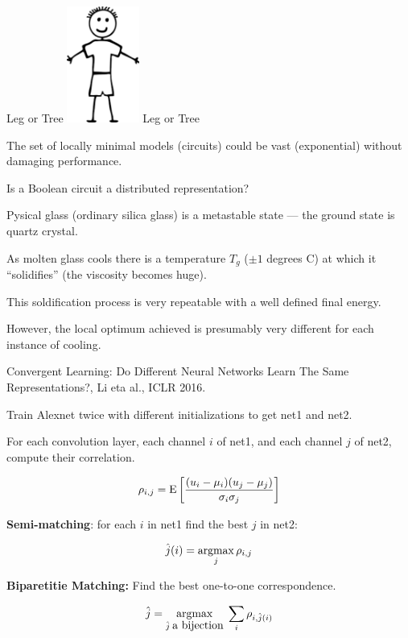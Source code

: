 {{\vfill
\centerline{Leg or Tree  \includegraphics[height=1.5in]{../images/StickFig} Leg or Tree}
}

\vfill
The set of locally minimal models (circuits) could be vast (exponential) without damaging performance.

\vfill
Is a Boolean circuit a distributed representation?


Pysical glass (ordinary silica glass) is a metastable state  --- the ground state is quartz crystal.

\vfill
As molten glass cools there is a temperature $T_g$ ($\pm 1$ degrees C) at which it ``solidifies'' (the viscosity becomes huge).

\vfill
This soldification process is very repeatable with a well defined final energy.

\vfill
However, the local optimum achieved is presumably very different for each instance of cooling.


Convergent Learning: Do Different Neural
Networks Learn The Same Representations?, Li eta al., ICLR 2016.

\vfill
Train Alexnet twice with different initializations to get net1 and net2.

\vfill
For each convolution layer, each channel $i$ of net1, and each channel $j$ of net2, compute their correlation.

\vfill
$$\rho_{i,j} = \mathrm{E}\left[\frac{(u_i - \mu_i)(u_j- \mu_j)}{\sigma_i \sigma_j}\right]$$


{\bf Semi-matching}: for each $i$ in net1 find the best $j$ in net2:

$$\hat{j}(i) = \operatorname*{argmax}_j \rho_{i,j}$$

\vfill
{\bf Biparetitie Matching:} Find the best one-to-one correspondence.

$$\hat{j} = \operatorname*{argmax}_{\hat{j}\;\mbox{a bijection}}\;\sum_i \rho_{i,\hat{j}(i)}$$

}

